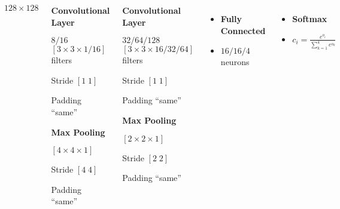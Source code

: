 \begin{frame}
\begin{columns}
{\begin{columns}
                     {$128\times 128$}
                \end{columns}
            }
             {
                \begin{itemize}
                    \item \textbf{Convolutional Layer}
                    \item $8/16$ $\left[3\times 3\times 1/16\right]$ filters
                    \item Stride $\left[1\;1\right]$
                    \item Padding ``same''
                     {
                        \item \textbf{Max Pooling}
                        \item $\left[4\times 4\times 1\right]$
                        \item Stride $\left[4\;4\right]$
                        \item Padding ``same''
                    }
                \end{itemize}
            }
             {
                \begin{itemize}
                    \item \textbf{Convolutional Layer}
                    \item $32/64/128$ $\left[3\times 3\times 16/32/64\right]$ filters
                    \item Stride $\left[1\;1\right]$
                    \item Padding ``same''
                     {
                        \item \textbf{Max Pooling}
                        \item $\left[2\times 2\times 1\right]$
                        \item Stride $\left[2\;2\right]$
                        \item Padding ``same''
                    }
                \end{itemize}
            }
             {
                \begin{itemize}
                    \item \textbf{Fully Connected}
                    \item $16/16/4$ neurons
                \end{itemize}
            }
             {
                \begin{itemize}
                    \item \textbf{Softmax}
                    \item $c_i = \frac{e^{o_i}}{\sum_{k = 1}^4 e^{o_k}}$
                \end{itemize}
            }
    \end{columns}
\end{frame}

